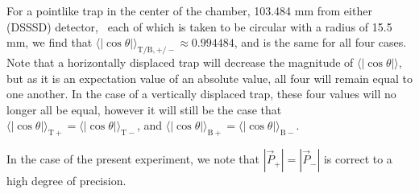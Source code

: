 For a pointlike trap in the center of the chamber, 103.484 mm from either (DSSSD) detector,~ each of which is taken to be circular with a radius of 15.5 mm, we find that $\langle | \cos\theta | \rangle_{\mathrm T/ \mathrm B, +/-} \approx 0.994484$, and is the same for all four cases.
 Note that a horizontally displaced trap will decrease the magnitude of $\langle | \cos\theta | \rangle $, but as it is an expectation value of an absolute value, all four will remain equal to one another.  In the case of a vertically displaced trap, these four values will no longer all be equal, however it will still be the case that $\langle | \cos\theta | \rangle_{\mathrm T +} = \langle | \cos\theta | \rangle_{\mathrm T -}$, and $\langle | \cos\theta | \rangle_{\mathrm B+} = \langle | \cos\theta | \rangle_{\mathrm B -}$.  

\note{}
In the case of the present experiment, we note that $|\vec{P}_+| = |\vec{P}_-|$ is correct to a high degree of precision.
\note{}


